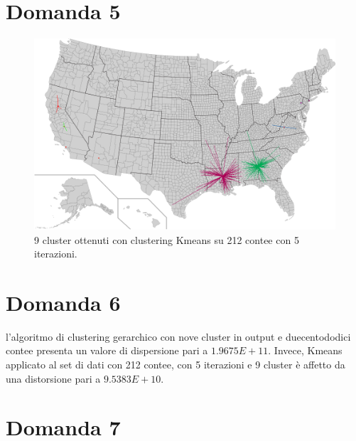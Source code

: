 \documentclass{article}
\begin{document}
\section*{Domanda 5}
\begin{center}
	\begin{figure}[H]
		\hspace*{1.5cm}\includegraphics[width=0.8\linewidth, valign=t]{figures/Domanda5}
		\caption*{9 cluster ottenuti con clustering Kmeans su 212 contee con 5 iterazioni.}
	\end{figure}
\end{center}
\section*{Domanda 6}
l'algoritmo di clustering gerarchico con nove cluster in output e duecentododici contee presenta un valore di dispersione pari a $1.9675E+11$.
Invece, Kmeans applicato al set di dati con 212 contee, con 5 iterazioni e 9 cluster è affetto da una distorsione pari a $9.5383E+10$.

\section*{Domanda 7}
\end{document}
